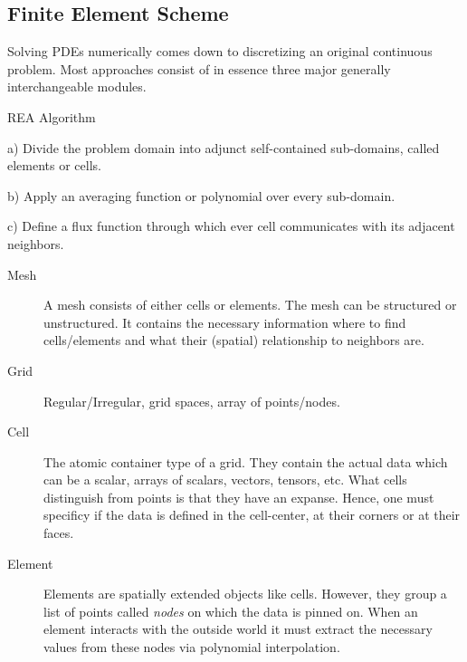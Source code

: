 \subsection{Finite Element Scheme}

Solving PDEs numerically comes down to discretizing an original continuous
problem. Most approaches consist of in essence three major generally
interchangeable modules.

REA Algorithm

a) Divide the problem domain into adjunct self-contained sub-domains, called
elements or cells.

b) Apply an averaging function or polynomial over every sub-domain.

c) Define a flux function through which ever cell communicates with its
adjacent neighbors.

\begin{description}
\item[Mesh] A mesh consists of either cells or elements. The mesh can be
structured or unstructured. It contains the necessary information where to find
cells/elements and what their (spatial) relationship to neighbors are.

\item[Grid] Regular/Irregular, grid spaces, array of points/nodes.

\item[Cell] The atomic container type of a grid. They contain the actual data
which can be a scalar, arrays of scalars, vectors, tensors, etc. What cells
distinguish from points is that they have an expanse. Hence, one must specificy
if the data is defined in the cell-center, at their corners or at their faces.

\item[Element] Elements are spatially extended objects like cells. However,
they group a list of points called \emph{nodes} on which the data is pinned on.
When an element interacts with the outside world it must extract the necessary
values from these nodes via polynomial interpolation.
\end{description}
